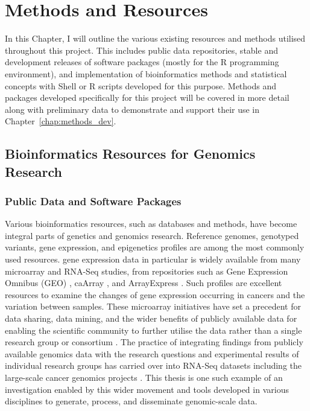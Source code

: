\chapter{Methods and Resources}
\label{chap:methods}

In this Chapter, I will outline the various existing resources and methods utilised throughout this project. This includes public data repositories, stable and development releases of software packages (mostly for the R programming environment), and implementation of \gls{bioinformatics} methods and statistical concepts with Shell or R scripts developed for this purpose. Methods and packages developed specifically for this project will be covered in more detail along with preliminary data to demonstrate and support their use in Chapter~\ref{chap:methods_dev}. 

\section{Bioinformatics Resources for Genomics Research}
\subsection{Public Data and Software Packages}
Various \gls{bioinformatics} resources, such as databases and methods, have become integral parts of genetics and \glspl{genomic} research. Reference \glspl{genome}, genotyped variants, \gls{gene expression}, and epigenetics profiles are among the most commonly used resources. \Gls{gene expression} data in particular is widely available from many \gls{microarray} and \acrshort{RNA}-Seq studies, from repositories such as Gene Expression Omnibus (GEO) \citep{GEO2016}, caArray \citep{caArray2014}, and ArrayExpress \citep{ArrayExpress2013}. Such profiles are excellent resources to examine the changes of \gls{gene expression} occurring in cancers and the variation between samples. These \gls{microarray} initiatives have set a precedent for data sharing, data mining, and the wider benefits of publicly available data for enabling the scientific community to further utilise the data rather than a single research group or consortium \citep{Rung2013}. The practice of integrating findings from publicly available \glspl{genomic} data with the research questions and experimental results of individual research groups has carried over into \acrshort{RNA}-Seq datasets including the large-scale cancer \glspl{genomic} projects \citep{ICGC2011}. This thesis is one such example of an investigation enabled by this wider movement and tools developed in various disciplines to generate, process, and disseminate \gls{genomic}-scale data.
 
